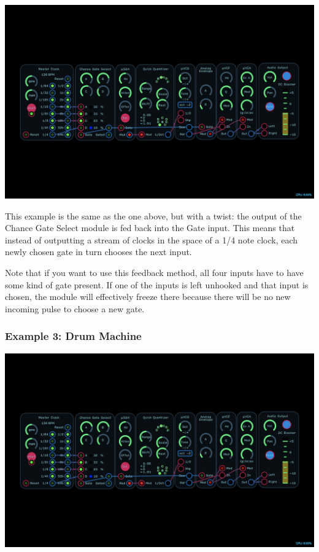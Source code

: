\documentclass[11pt]{book}
\begin{document}
\begin{multicols*}{2}
\begin{center}
\includegraphics[width=0.95\linewidth]{chance-gate-select-fig6.png}
\end{center}

This example is the same as the one above, but with a twist: the output of the Chance Gate Select module is fed back into the Gate input. This means that instead of outputting a stream of clocks in the space of a 1/4 note clock, each newly chosen gate in turn chooses the next input.

Note that if you want to use this feedback method, all four inputs have to have some kind of gate present. If one of the inputs is left unhooked and that input is chosen, the module will effectively freeze there because there will be no new incoming pulse to choose a new gate.

\subsubsection*{Example 3: Drum Machine}

\begin{center}
\includegraphics[width=0.95\linewidth]{chance-gate-select-fig6.png}
\end{center}


\end{multicols*}
\end{document}

